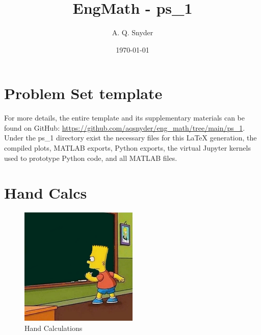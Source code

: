 \documentclass{article}
\begin{document}
\title{EngMath - ps\_1}
\author{A. Q. Snyder}
\date{\today}

\maketitle

\section{Problem Set template}

For more details, the entire template and its supplementary materials can be found on GitHub: \href{https://github.com/aqsnyder/eng_math/tree/main/ps_1}{https://github.com/aqsnyder/eng_math/tree/main/ps_1}.
Under the ps\_1 directory exist the necessary files for this LaTeX generation, the compiled plots, MATLAB exports, Python exports, the virtual Jupyter kernels used to prototype Python code, and all MATLAB files.



\section{Hand Calcs}
\begin{figure}[htbp]
    \centering
    \includegraphics[width=0.5\textwidth]{misc_media/hand-calcs.jpg}
    \caption{Hand Calculations}
    \label{fig:hand-calcs}
\end{figure}

\vspace{2cm}  %

 
 
 
 

\end{document}
